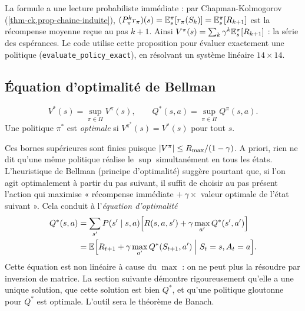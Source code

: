 La formule a une lecture probabiliste immédiate : par Chapman-Kolmogorov (\cref{thm-ck,prop-chaine-induite}), $(P_\pi^kr_\pi)(s)=\mathbb{E}^\pi_s[r_\pi(S_k)]=\mathbb{E}^\pi_s[R_{k+1}]$ est la récompense moyenne reçue au pas $k+1$. Ainsi $V^\pi(s)=\sum_k\gamma^k\mathbb{E}^\pi_s[R_{k+1}]$ : la série des espérances. Le code utilise cette proposition pour évaluer exactement une politique (\texttt{evaluate\_policy\_exact}), en résolvant un système linéaire $14\times14$.

\subsection{Équation d'optimalité de Bellman}

\begin{definition}
\[
V^*(s)=\sup_{\pi\in\Pi}V^\pi(s),\qquad Q^*(s,a)=\sup_{\pi\in\Pi}Q^\pi(s,a).
\]
Une politique $\pi^*$ est \emph{optimale} si $V^{\pi^*}(s)=V^*(s)$ pour tout $s$.
\end{definition}

Ces bornes supérieures sont finies puisque $\left\lvert V^\pi \right\rvert\le R_{\max}/(1-\gamma)$. A priori, rien ne dit qu'une même politique réalise le $\sup$ simultanément en tous les états. L'heuristique de Bellman (principe d'optimalité) suggère pourtant que, si l'on agit optimalement à partir du pas suivant, il suffit de choisir au pas présent l'action qui maximise « récompense immédiate $+\ \gamma\times$ valeur optimale de l'état suivant ». Cela conduit à l'\emph{équation d'optimalité}
\begin{equation}\label{eq-bellman-opt}
\begin{split}
Q^*(s,a)&=\sum_{s'}P(s'\mid s,a)\Big[R(s,a,s')+\gamma\max_{a'}Q^*(s',a')\Big]\\
&=\mathbb{E}\Big[R_{t+1}+\gamma\max_{a'}Q^*(S_{t+1},a')\;\Big|\;S_t=s,A_t=a\Big].
\end{split}
\end{equation}
Cette équation est non linéaire à cause du $\max$ : on ne peut plus la résoudre par inversion de matrice. La section suivante démontre rigoureusement qu'elle a une unique solution, que cette solution est bien $Q^*$, et qu'une politique gloutonne pour $Q^*$ est optimale. L'outil sera le théorème de Banach.
